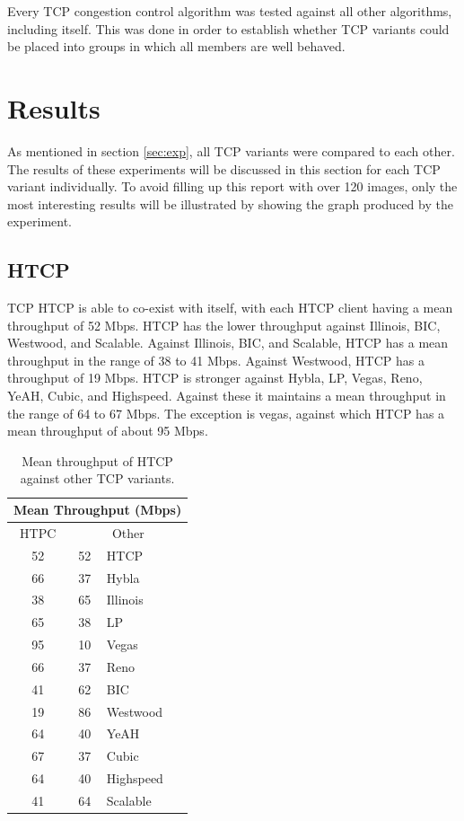 \documentclass[11pt,a4paper,twocolumn]{article}
\begin{document}
Every TCP congestion control algorithm was tested against all other algorithms, including itself. This was done in order to establish whether TCP variants
could be placed into groups in which all members are well behaved. 

\section{Results}
\label{sec:results}

As mentioned in section \ref{sec:exp}, all TCP variants were compared to each other. The results of these experiments will
be discussed in this section for each TCP variant individually. To avoid filling up this report with over 120 images, only
the most interesting results will be illustrated by showing the graph produced by the experiment.

\subsection{HTCP}
TCP HTCP is able to co-exist with itself, with each HTCP client having a mean throughput of 52 Mbps. HTCP has the lower throughput against Illinois, BIC, Westwood, and Scalable. 
Against Illinois, BIC, and Scalable, HTCP has a mean throughput in the range of 38 to 41 Mbps. Against Westwood, HTCP
has a throughput of 19 Mbps. HTCP is stronger against Hybla, LP, Vegas, Reno, YeAH, Cubic, and Highspeed. Against these it maintains a mean throughput
in the range of 64 to 67 Mbps. The exception is vegas, against which HTCP has a mean throughput of about 95 Mbps.

\begin{table}[h!]
	\begin{center}
		\begin{tabular}{| c | c | l |}
    			\hline
			\multicolumn{3}{|c|}{Mean Throughput (Mbps)} \\
    			\hline
    			HTPC &  \multicolumn{2}{|c|}{Other}  \\
			\hline
    			52 & 52 & HTCP \\
			\hline
    			66 & 37 & Hybla \\
			\hline
    			38 & 65 & Illinois \\
			\hline
    			65 & 38 & LP \\
			\hline
    			95 & 10 & Vegas \\
			\hline
    			66 & 37 & Reno \\
			\hline
    			41 & 62 & BIC \\
			\hline
    			19 & 86 & Westwood \\
			\hline
    			64 & 40 & YeAH \\
			\hline
    			67 & 37 & Cubic \\
			\hline
    			64 & 40 & Highspeed \\
			\hline
    			41 & 64 & Scalable \\
    			\hline
    		\end{tabular}
  	\end{center}
  	\caption{Mean throughput of HTCP against other TCP variants.}
	\label{table:htcp}
\end{table}
\end{document}

